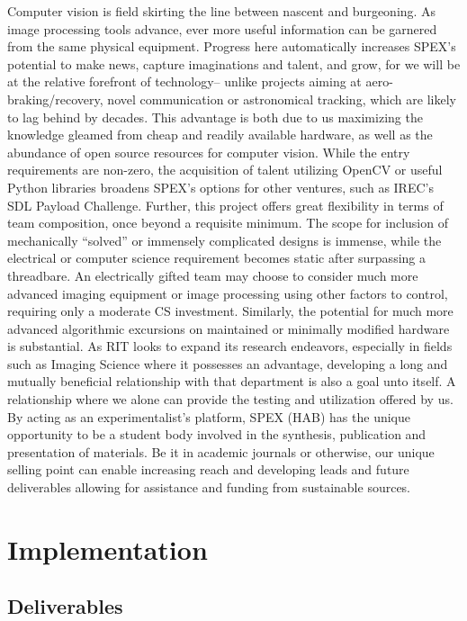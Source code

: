 \documentclass[conference]{IEEEtran} %
\begin{document}
Computer vision is field skirting the line between nascent and burgeoning. As image processing tools advance, ever more useful information can be garnered from the same physical equipment. Progress here automatically increases SPEX’s potential to make news, capture imaginations and talent, and grow, for we will be at the relative forefront of technology-- unlike projects aiming at aero-braking/recovery, novel communication or astronomical tracking, which are likely to lag behind by decades. This advantage is both due to us maximizing the knowledge gleamed from cheap and readily available hardware, as well as the abundance of open source resources for computer vision. While the entry requirements are non-zero, the acquisition of talent utilizing OpenCV or useful Python libraries broadens SPEX’s options for other ventures, such as IREC’s SDL Payload Challenge. Further, this project offers great flexibility in terms of team composition, once beyond a requisite minimum. The scope for inclusion of mechanically “solved” or immensely complicated designs is immense, while the electrical or computer science requirement becomes static after surpassing a threadbare. An electrically gifted team may choose to consider much more advanced imaging equipment or image processing using other factors to control, requiring only a moderate CS investment. Similarly, the potential for much more advanced algorithmic excursions on maintained or minimally modified hardware is substantial. As RIT looks to expand its research endeavors, especially in fields such as Imaging Science where it possesses an advantage, developing a long and mutually beneficial relationship with that department is also a goal unto itself. A relationship where we alone can provide the testing and utilization offered by us. By acting as an experimentalist’s platform, SPEX (HAB) has the unique opportunity to be a student body involved in the synthesis, publication and presentation of materials. Be it in academic journals or otherwise, our unique selling point can enable increasing reach and developing leads and future deliverables allowing for assistance and funding from sustainable sources.

\section{Implementation}

\subsection{Deliverables}
\end{document}
